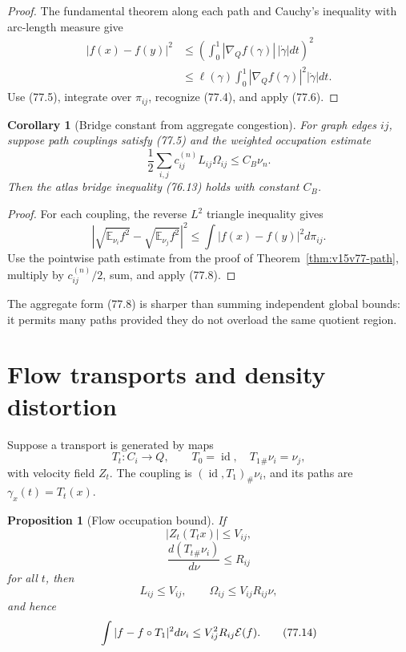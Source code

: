 \documentclass[11pt]{article}
\newtheorem{proposition}[theorem]{Proposition}
\newtheorem{corollary}[theorem]{Corollary}
\theoremstyle{remark}
\begin{document}
\begin{proof}
The fundamental theorem along each path and Cauchy's inequality
with arc-length measure give
\[
\begin{split}
 |f(x)-f(y)|^2
 &\leq
 \left(\int_0^1
 |\nabla_Qf(\gamma)|\,|\dot\gamma|dt\right)^2\\
 &\leq
 \ell(\gamma)
 \int_0^1|\nabla_Qf(\gamma)|^2|\dot\gamma|dt.
\end{split}
\]
Use (77.5), integrate over \(\pi_{ij}\), recognize (77.4), and
apply (77.6).
\end{proof}

\begin{corollary}[Bridge constant from aggregate congestion]
\label{cor:v15v77-aggregate}
For graph edges \(ij\), suppose path couplings satisfy (77.5) and
the weighted occupation estimate
\[
 \frac12\sum_{i,j}c_{ij}^{(n)}L_{ij}\Omega_{ij}
 \leq C_B\nu_n.                                      \tag{77.8}
\]
Then the atlas bridge inequality (76.13) holds with constant
\(C_B\).
\end{corollary}

\begin{proof}
For each coupling, the reverse \(L^2\) triangle inequality gives
\[
 \left|
 \sqrt{\mathbb E_{\nu_i}f^2}
 -\sqrt{\mathbb E_{\nu_j}f^2}
 \right|^2
 \leq
 \int|f(x)-f(y)|^2d\pi_{ij}.                          \tag{77.9}
\]
Use the pointwise path estimate from the proof of
Theorem~\ref{thm:v15v77-path}, multiply by
\(c_{ij}^{(n)}/2\), sum, and apply (77.8).
\end{proof}

The aggregate form (77.8) is sharper than summing independent
global bounds: it permits many paths provided they do not overload
the same quotient region.

\section{Flow transports and density distortion}

Suppose a transport is generated by maps
\[
 T_t:C_i\to Q,\qquad T_0=\operatorname{id},\quad
 T_1{}_\#\nu_i=\nu_j,                                 \tag{77.10}
\]
with velocity field \(Z_t\).  The coupling is
\((\operatorname{id},T_1)_\#\nu_i\), and its paths are
\(\gamma_x(t)=T_t(x)\).

\begin{proposition}[Flow occupation bound]
\label{prop:v15v77-flow}
If
\[
 |Z_t(T_t x)|\leq V_{ij},                             \tag{77.11}
\]
\[
 \frac{d(T_t{}_\#\nu_i)}{d\nu}\leq R_{ij}             \tag{77.12}
\]
for all \(t\), then
\[
 L_{ij}\leq V_{ij},\qquad
 \Omega_{ij}\leq V_{ij}R_{ij}\nu,                    \tag{77.13}
\]
and hence
\[
 \int|f-f\circ T_1|^2d\nu_i
 \leq V_{ij}^2R_{ij}{\cal E}(f).                     \tag{77.14}
\]
\end{proposition}
\end{document}
